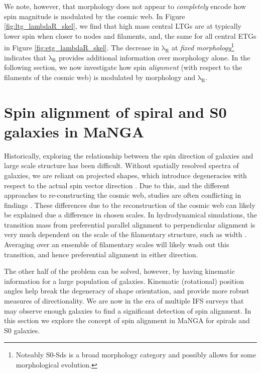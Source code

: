 We note, however, that morphology does not appear to \textit{completely} encode how spin magnitude is modulated by the cosmic web. In Figure \ref{fig:ltg_lambdaR_skel}, we find that high mass central LTGs are at typically lower spin when closer to nodes and filaments, and, the same for all central ETGs in Figure \ref{fig:etg_lambdaR_skel}. The decrease in $\mathrm{\lambda_R}$ at \textit{fixed morphology}\footnote{Noteably S0-Sds is a broad morphology category and possibly allows for some morphological evolution.} indicates that $\mathrm{\lambda_R}$ provides additional information over morphology alone. In the following section, we now investigate how spin \textit{alignment} (with respect to the filaments of the cosmic web) is modulated by morphology and $\mathrm{\lambda_R}$. 

\section{Spin alignment of spiral and S0 galaxies in MaNGA} \label{sec:spin_alignment}
Historically, exploring the relationship between the spin direction of galaxies and large scale structure has been difficult. Without spatially resolved spectra of galaxies, we are reliant on projected shapes, which introduce degeneracies with respect to the actual spin vector direction \citep[e.g. see Fig 2. in][for example of degeneracies that can occur]{motloch2020}. Due to this, and the different approaches to re-constructing the cosmic web, studies are often conflicting in findings \citep[e.g. spiral galaxies having parallel vs perpendicular orientations with respect to the cosmic web][]{tempel2013a, tempel2013, lee2007, jones2010, zhang2015}. These differences due to the reconstruction of the cosmic web can likely be explained due a difference in chosen scales. In hydrodynamical simulations, the transition mass from preferential parallel alignment to perpendicular alignment is very much dependent on the scale of the filamentary structure, such as width \citep{ganeshaiahveena2019, Kraljic2019flip}. Averaging over an ensemble of filamentary scales will likely wash out this transition, and hence preferential alignment in either direction. 

The other half of the problem can be solved, however, by having kinematic information for a large population of galaxies. Kinematic (rotational) position angles help break the degeneracy of shape orientation, and provide more robust measures of directionality. We are now in the era of multiple IFS surveys that may observe enough galaxies to find a significant detection of spin alignment. In this section we explore the concept of spin alignment in MaNGA for spirals and S0 galaxies.

